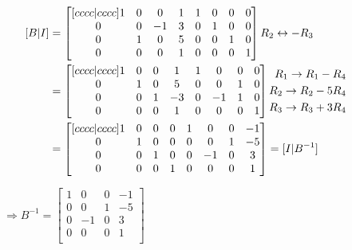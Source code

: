 \documentclass[12pt,letterpaper]{article}
\begin{document}
\begin{enumerate}[leftmargin=*]
\vspace{-2em}
\begin{equation*}
\hspace{-2.5em}\begin{split}
[B | I] 
& = \begin{bmatrix}[cccc|cccc]
1 & 0 & 0  & 1 & 1 & 0 & 0 & 0\\
0 & 0 & -1 & 3 & 0 & 1 & 0 & 0\\
0 & 1 & 0  & 5 & 0 & 0 & 1 & 0\\
0 & 0 & 0  & 1 & 0 & 0 & 0 & 1\\
\end{bmatrix} R_2 \leftrightarrow -R_3 &\\
& = \begin{bmatrix}[cccc|cccc]
1 & 0 & 0 & 1  & 1 & 0  & 0 & 0\\
0 & 1 & 0 & 5  & 0 & 0  & 1 & 0\\
0 & 0 & 1 & -3 & 0 & -1 & 1 & 0\\
0 & 0 & 0 & 1  & 0 & 0  & 0 & 1\\
\end{bmatrix} \begin{aligned} R_1 \rightarrow R_1 - R_4 \\ R_2 \rightarrow R_2 - 5 R_4 \\ R_3 \rightarrow R_3 + 3 R_4 \end{aligned} &\\
& = \begin{bmatrix}[cccc|cccc]
1 & 0 & 0 & 0 & 1 & 0  & 0 & -1\\
0 & 1 & 0 & 0 & 0 & 0  & 1 & -5\\
0 & 0 & 1 & 0 & 0 & -1 & 0 &  3\\
0 & 0 & 0 & 1 & 0 & 0  & 0 &  1\\
\end{bmatrix} = [I | B^{-1}] 
\end{split}
\end{equation*}

$\Rightarrow B^{-1} = \begin{bmatrix}
1 & 0  & 0 & -1\\
0 & 0  & 1 & -5\\
0 & -1 & 0 &  3\\
0 & 0  & 0 &  1\\
\end{bmatrix}$


\end{enumerate}
\end{document}
